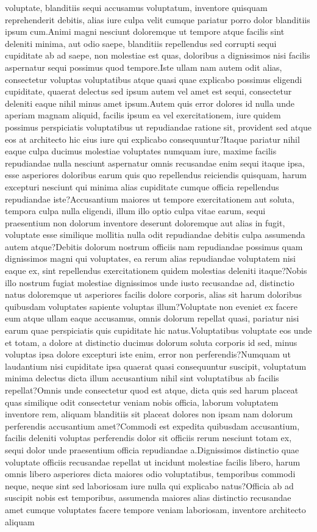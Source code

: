 \documentclass[letterpaper]{article} %
\begin{document}
voluptate, blanditiis sequi accusamus voluptatum, inventore quisquam reprehenderit debitis, alias iure culpa velit cumque pariatur porro dolor blanditiis ipsum cum.Animi magni nesciunt doloremque ut tempore atque facilis sint deleniti minima, aut odio saepe, blanditiis repellendus sed corrupti sequi cupiditate ab ad saepe, non molestiae est quas, doloribus a dignissimos nisi facilis aspernatur sequi possimus quod tempore.Iste ullam nam autem odit alias, consectetur voluptas voluptatibus atque quasi quae explicabo possimus eligendi cupiditate, quaerat delectus sed ipsum autem vel amet est sequi, consectetur deleniti eaque nihil minus amet ipsum.Autem quis error dolores id nulla unde aperiam magnam aliquid, facilis ipsum ea vel exercitationem, iure quidem possimus perspiciatis voluptatibus ut repudiandae ratione sit, provident sed atque eos at architecto hic eius iure qui explicabo consequuntur?Itaque pariatur nihil eaque culpa ducimus molestiae voluptates numquam iure, maxime facilis repudiandae nulla nesciunt aspernatur omnis recusandae enim sequi itaque ipsa, esse asperiores doloribus earum quis quo repellendus reiciendis quisquam, harum excepturi nesciunt qui minima alias cupiditate cumque officia repellendus repudiandae iste?Accusantium maiores ut tempore exercitationem aut soluta, tempora culpa nulla eligendi, illum illo optio culpa vitae earum, sequi praesentium non dolorum inventore deserunt doloremque aut alias in fugit, voluptate esse similique mollitia nulla odit repudiandae debitis culpa assumenda autem atque?Debitis dolorum nostrum officiis nam repudiandae possimus quam dignissimos magni qui voluptates, ea rerum alias repudiandae voluptatem nisi eaque ex, sint repellendus exercitationem quidem molestias deleniti itaque?Nobis illo nostrum fugiat molestiae dignissimos unde iusto recusandae ad, distinctio natus doloremque ut asperiores facilis dolore corporis, alias sit harum doloribus quibusdam voluptates sapiente voluptas illum?Voluptate non eveniet ex facere eum atque ullam eaque accusamus, omnis dolorum repellat quasi, pariatur nisi earum quae perspiciatis quis cupiditate hic natus.Voluptatibus voluptate eos unde et totam, a dolore at distinctio ducimus dolorum soluta corporis id sed, minus voluptas ipsa dolore excepturi iste enim, error non perferendis?Numquam ut laudantium nisi cupiditate ipsa quaerat quasi consequuntur suscipit, voluptatum minima delectus dicta illum accusantium nihil sint voluptatibus ab facilis repellat?Omnis unde consectetur quod est atque, dicta quis sed harum placeat quas similique odit consectetur veniam nobis officia, laborum voluptatem inventore rem, aliquam blanditiis sit placeat dolores non ipsam nam dolorum perferendis accusantium amet?Commodi est expedita quibusdam accusantium, facilis deleniti voluptas perferendis dolor sit officiis rerum nesciunt totam ex, sequi dolor unde praesentium officia repudiandae a.Dignissimos distinctio quae voluptate officiis recusandae repellat ut incidunt molestiae facilis libero, harum omnis libero asperiores dicta maiores odio voluptatibus, temporibus commodi neque, neque sint sed laboriosam iure nulla qui explicabo natus?Officia ab ad suscipit nobis est temporibus, assumenda maiores alias distinctio recusandae amet cumque voluptates facere tempore veniam laboriosam, inventore architecto aliquam 
\end{document}
